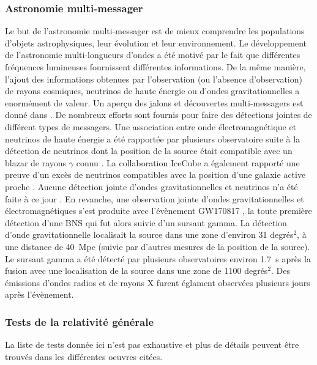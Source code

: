 \subsubsection*{Astronomie multi-messager}
\label{sec:multimessenger}
Le but de l'astronomie multi-messager est de mieux comprendre les populations d'objets astrophysiques, leur évolution et leur environnement.
Le développement de l'astronomie multi-longueurs d'ondes a été motivé par le fait que différentes fréquences lumineuses fournissent différentes informations.
De la même manière, l'ajout des informations obtenues par l'observation (ou l'absence d'observation) de rayons cosmiques, neutrinos de haute énergie ou d'ondes gravitationnelles a enormément de valeur.
Un aperçu des jalons et découvertes multi-messagers est donné dans \cite{multimessenger}.
De nombreux efforts sont fournis pour faire des détections jointes de différent types de messagers.
Une association entre onde électromagnétique et neutrinos de haute énergie a été rapportée par plusieurs observatoire suite à la détection de neutrinos dont la position de la source était compatible avec un blazar de rayons $\gamma$ connu \cite{blazar_neutrino}.
La collaboration IceCube a également rapporté une preuve d'un excès de neutrinos compatibles avec la position d'une galaxie active proche \cite{agn_neutrino}.
Aucune détection jointe d'ondes gravitationnelles et neutrinos n'a été faite à ce jour \cite{hen_gw_antares,hen_gw_icecube}.
En revanche, une observation jointe d'ondes gravitationnelles et électromagnétiques s'est produite avec l'évènement GW170817 \cite{gw170817_multi,gw170817_multi_2}, la toute première détection d'une BNS qui fut alors suivie d'un sursaut gamma.
La détection d'onde gravitationnelle localisait la source dans une zone d'environ 31 degrés$^2$, à une distance de \SI{40}{Mpc} (suivie par d'autres mesures de la position de la source).
Le sursaut gamma a été détecté par plusieurs observatoires environ \SI{1.7}{s} après la fusion avec une localisation de la source dans une zone de 1100 degrés$^2$.
Des émissions d'ondes radios et de rayons X furent églament observées plusieurs jours après l'évènement.


\subsubsection*{Tests de la relativité générale}
\label{sec:testingGR}
La liste de tests donnée ici n'est pas exhaustive et plus de détails peuvent être trouvés dans les différentes oeuvres citées.

